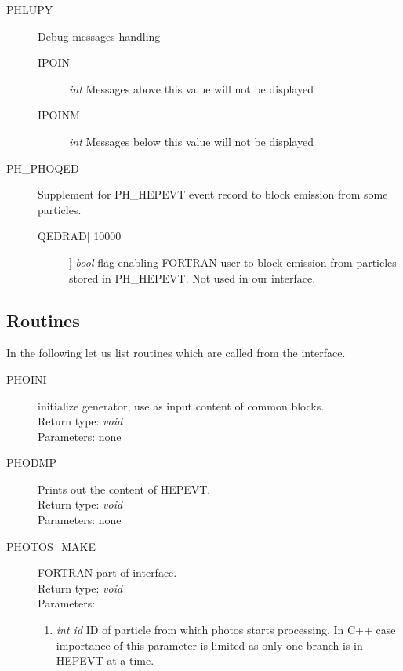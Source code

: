 \documentclass[]{Photos_interface_design}
\begin{document}
\begin{description}
\item[PHLUPY] Debug messages handling
    \begin{description}
    \item[IPOIN]  \textit{int} Messages above this value will not be displayed
	\item[IPOINM] \textit{int} Messages below this value will not be displayed
    \end{description}
\end{description}

\begin{description}
\item[PH\_PHOQED] Supplement for PH\_HEPEVT event record to block emission 
from some particles.
    \begin{description}
    \item[QEDRAD[ 10000]]  \textit{bool} flag enabling FORTRAN user
    to block emission from particles stored in PH\_HEPEVT. Not used in 
     our interface.
    \end{description}
\end{description}

\subsection{Routines}

In the following let us list routines which are called from the interface.

\begin{description}
\item[PHOINI] initialize generator, use as input content of common blocks. \\
  Return type: \textit{void} \\
  Parameters: none
\end{description}

\begin{description}
\item[PHODMP] Prints out the content of HEPEVT. \\
  Return type: \textit{void} \\
  Parameters: none
\end{description}

\begin{description}
\item[PHOTOS\_MAKE] FORTRAN part of interface. \\
  Return type: \textit{void} \\
  Parameters:
  \begin{enumerate}
    \item \textit {int id} ID of particle from which photos starts processing. In C++ case importance of this parameter is limited as only one branch is in HEPEVT at a time.
  \end{enumerate}
\end{description}
\end{document}
